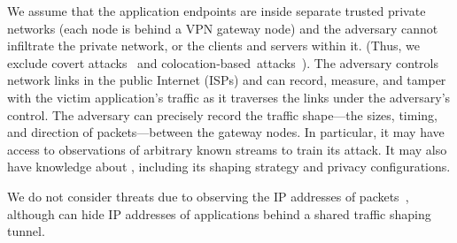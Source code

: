 We assume that the application endpoints are inside separate trusted
private networks (\eg each node is behind a VPN gateway node) and the adversary
cannot infiltrate the private network, or the clients and servers within it.
(Thus, we exclude covert attacks~\cite{zhang2011predinteractive} and
colocation-based~attacks~\cite{schuster2017beautyburst,mehta2022pacer}).
The adversary controls network links in the public Internet (\eg ISPs) and can
record, measure, and tamper with the victim application's traffic as it
traverses the links under the adversary's control.
The adversary can precisely record the traffic shape---the sizes, timing,
and direction of packets---between the {gateway nodes}.
In particular, it may have access to observations of arbitrary known
streams to train its attack.
It may also have knowledge about {\sys}, including its
shaping strategy and privacy configurations.

We do not consider threats due to observing the IP addresses of
packets~\cite{hoang2021domain}, although {\sys} can hide IP addresses of
applications behind a shared traffic shaping tunnel.

